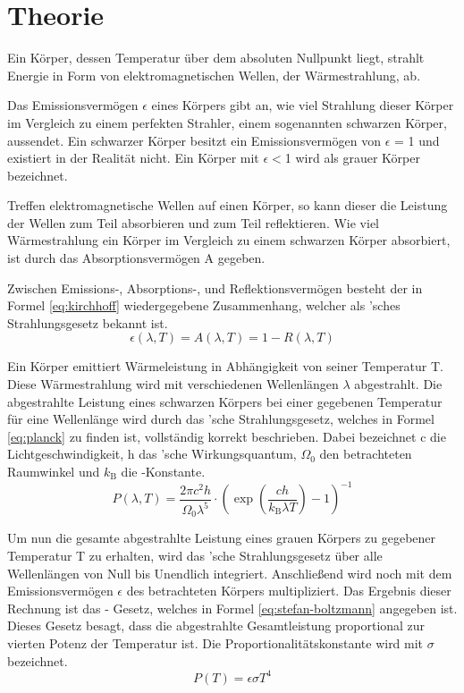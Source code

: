 
\section{Theorie}
Ein Körper, dessen Temperatur über dem absoluten Nullpunkt liegt, strahlt Energie in Form von elektromagnetischen Wellen, der Wärmestrahlung, ab.

Das Emissionsvermögen $\epsilon$ eines Körpers gibt an,  wie viel Strahlung dieser Körper im Vergleich zu einem perfekten Strahler, einem sogenannten schwarzen Körper, aussendet. Ein schwarzer Körper besitzt ein Emissionsvermögen von $\epsilon$ = 1 und existiert in der Realität nicht. Ein Körper mit $\epsilon <$1 wird als grauer Körper bezeichnet.

Treffen elektromagnetische Wellen auf einen Körper, so kann dieser die Leistung der Wellen zum Teil absorbieren und zum Teil reflektieren. Wie viel Wärmestrahlung ein Körper im Vergleich zu einem schwarzen Körper absorbiert, ist durch das Absorptionsvermögen A gegeben.

Zwischen Emissions-, Absorptions-, und Reflektionsvermögen besteht der in Formel \eqref{eq:kirchhoff} wiedergegebene Zusammenhang, welcher als 'sches Strahlungsgesetz bekannt ist.
%
\begin{equation}
\label{eq:kirchhoff}
\epsilon(\lambda, T) = A(\lambda, T) = 1- R(\lambda,T)
\end{equation}
%

Ein Körper emittiert Wärmeleistung in Abhängigkeit von seiner Temperatur T. Diese Wärmestrahlung wird mit verschiedenen Wellenlängen $\lambda$ abgestrahlt. Die abgestrahlte Leistung eines schwarzen Körpers bei einer gegebenen Temperatur für eine Wellenlänge wird durch das 'sche Strahlungsgesetz, welches in Formel \eqref{eq:planck} zu finden ist, vollständig korrekt beschrieben. Dabei bezeichnet c die Lichtgeschwindigkeit, h das 'sche Wirkungsquantum, $\Omega_0$ den betrachteten Raumwinkel und $k_\text{B}$ die -Konstante.
%
\begin{equation}
\label{eq:planck}
P(\lambda,T) = \frac{2 \pi c^2 h}{\Omega_0 \lambda^5} \cdot {\left(\exp{\left(\frac{ch}{k_\text{B} \lambda T}\right)} -1\right)}^{-1}
\end{equation}
%

Um nun die gesamte abgestrahlte Leistung eines grauen Körpers zu gegebener Temperatur T zu erhalten, wird das 'sche Strahlungsgesetz über alle Wellenlängen von Null bis Unendlich integriert. Anschließend wird noch mit dem Emissionsvermögen $\epsilon$ des betrachteten Körpers multipliziert.
 Das Ergebnis dieser Rechnung ist das - Gesetz, welches in Formel \eqref{eq:stefan-boltzmann} angegeben ist.
Dieses Gesetz besagt, dass die abgestrahlte Gesamtleistung proportional zur vierten Potenz der Temperatur ist. Die Proportionalitätskonstante wird mit $\sigma$ bezeichnet.
%
\begin{equation}
\label{eq:stefan-boltzmann}
P(T) = \epsilon \sigma T^4
\end{equation}
%